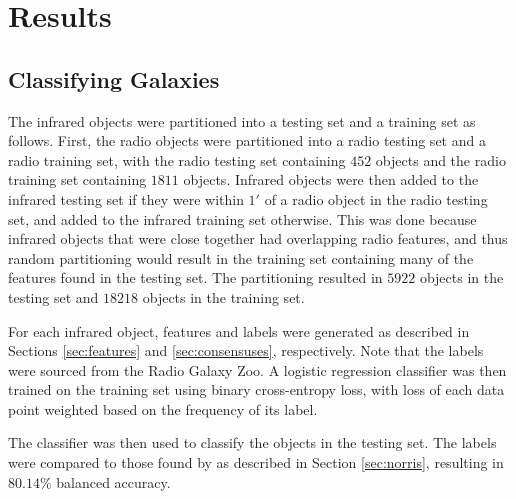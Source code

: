 \section{Results}
\label{sec:rgz-results}
  
  \subsection{Classifying Galaxies}


    The infrared objects were partitioned into a testing set and a training set
    as follows. First, the radio objects were partitioned into a radio testing
    set and a radio training set, with the radio testing set containing $452$
    objects and the radio training set containing $1811$ objects. Infrared
    objects were then added to the infrared testing set if they were within $1'$
    of a radio object in the radio testing set, and added to the infrared
    training set otherwise. This was done because infrared objects that were
    close together had overlapping radio features, and thus random partitioning
    would result in the training set containing many of the features found in
    the testing set. The partitioning resulted in $5922$ objects in the testing
    set and $18218$ objects in the training set.

    For each infrared object, features and labels were generated as described in
    Sections \ref{sec:features} and \ref{sec:consensuses}, respectively. Note
    that the labels were sourced from the Radio Galaxy Zoo. A logistic
    regression classifier was then trained on the training set using binary
    cross-entropy loss, with loss of each data point weighted based on the
    frequency of its label.

    The classifier was then used to classify the objects in the testing set. The
    labels were compared to those found by \citet{norris06} as described in
    Section \ref{sec:norris}, resulting in $80.14\%$ balanced accuracy.


